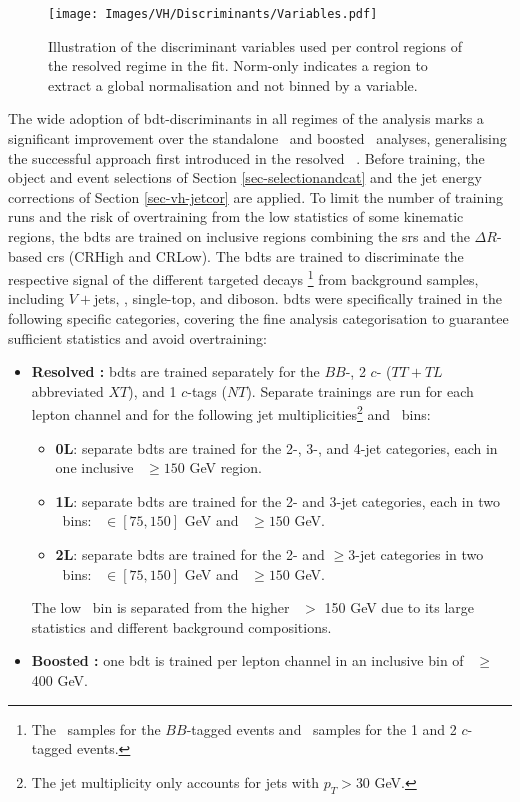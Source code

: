 \begin{figure}[h!]
  \center
  \texttt{[image: Images/VH/Discriminants/Variables.pdf]}
  \caption{Illustration of the discriminant variables used per control regions of the resolved regime in the fit. Norm-only indicates a region to extract a global normalisation and not binned by a variable.} %
  \label{fig:variablesControlReg}
\end{figure}

The wide adoption of \gls{bdt}-discriminants in all regimes of the analysis marks a significant improvement over the standalone \vhc\ and boosted \vhb\ analyses, generalising the successful approach first introduced in the resolved \vhb\ \cite{ATLAS:2020fcp}. Before training, the object and event selections of Section \ref{sec-selectionandcat} and the jet energy corrections of Section \ref{sec-vh-jetcor} are applied. To limit the number of training runs and the risk of overtraining from the low statistics of some kinematic regions, the \gls{bdt}s are trained on inclusive regions combining the \gls{sr}s and the $\Delta R$-based \gls{cr}s (CRHigh and CRLow). The \gls{bdt}s are trained to discriminate the respective signal of the different targeted decays \footnote{The \vhb\ samples for the $BB$-tagged events and \vhc\ samples for the 1 and 2 $c$-tagged events.} from background samples, including $V+$jets, \ttb, single-top, and diboson. \gls{bdt}s were specifically trained in the following specific categories, covering the fine analysis categorisation to guarantee sufficient statistics and avoid overtraining:
\begin{itemize}[leftmargin=*]
  \item \textbf{Resolved \boldvhbc:} \gls{bdt}s are trained separately for the $BB$-, 2 $c$- ($TT+TL$ abbreviated $XT$), and 1 $c$-tags ($NT$). Separate trainings are run for each lepton channel and for the following jet multiplicities\footnote{The jet multiplicity only accounts for jets with $p_T > 30$ GeV.} and \ptv\ bins:
  \begin{itemize}
      \item \textbf{0L}: separate \gls{bdt}s are trained for the 2-, 3-, and 4-jet categories, each in one inclusive \ptv\ $\geq 150$ GeV region.
      \item \textbf{1L}: separate \gls{bdt}s are trained for the 2- and 3-jet categories, each in two \ptv\ bins: \ptv\ $\in [75, 150]$ GeV and \ptv\ $\geq 150$ GeV.
      \item \textbf{2L}: separate \gls{bdt}s are trained for the 2- and $\geq$3-jet categories in two \ptv\ bins: \ptv\ $\in [75, 150]$ GeV and \ptv\ $\geq 150$ GeV.
  \end{itemize}
  The low \ptv\ bin is separated from the higher \ptv\ $>$ 150 GeV due to its large statistics and different background compositions.
  \item \textbf{Boosted \vhb:} one \gls{bdt} is trained per lepton channel in an inclusive bin of \ptv\ $\geq$ 400 GeV.
\end{itemize}

